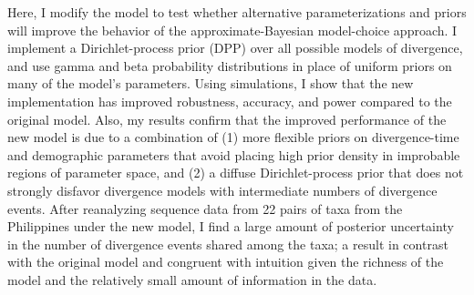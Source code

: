 
Here, I modify the \msb model to test whether alternative parameterizations and
priors will improve the behavior of the approximate-Bayesian model-choice
approach.
I implement a Dirichlet-process prior (DPP) over all possible models of
divergence, and use gamma and beta probability distributions in place of
uniform priors on many of the model's parameters.
Using simulations, I show that the new implementation has improved robustness,
accuracy, and power compared to the original model.
Also, my results confirm that the improved performance of the new model
is due to a combination of
(1) more flexible priors on divergence-time and demographic parameters that
avoid placing high prior density in improbable regions of parameter space, and
(2) a diffuse Dirichlet-process prior that does not strongly disfavor
divergence models with intermediate numbers of divergence events.
After reanalyzing sequence data from 22 pairs of taxa from the Philippines
\citep{Oaks2012} under the new model, I find a large amount of posterior
uncertainty in the number of divergence events shared among the taxa; a result
in contrast with the original \msb model and congruent with
intuition given the richness of the model and the relatively small amount of
information in the data.



